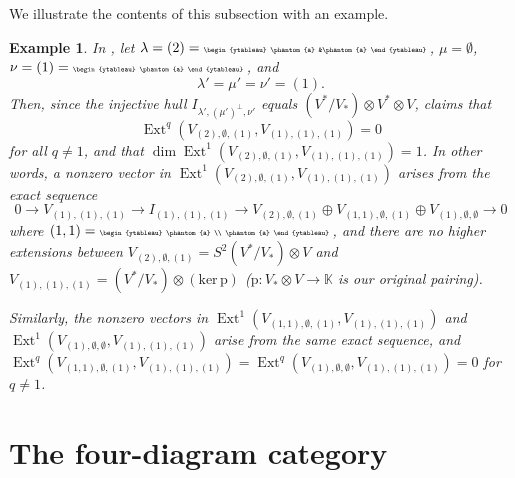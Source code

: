\documentclass[11pt]{article}
\theoremstyle{plain}
\theoremstyle{nonumberplain}
\theoremstyle{plain}
\newtheorem{example}[lemma]{Example}
\theoremstyle{nonumberplain}
\DeclareMathOperator{\Ext}{\mathrm{Ext}}
\begin{document}
We illustrate the contents of this subsection with an example. 


\begin{example}
  In , let $\lambda=(2)={\tiny\begin{ytableau}
 \phantom{a} &\phantom{a}
\end{ytableau}}\,$, $\mu=\emptyset$,  $\nu=(1)={\tiny\begin{ytableau}
 \phantom{a} 
\end{ytableau}}\,$, and 
  \begin{equation*}
    \lambda'=\mu'=\nu'=(1). 
  \end{equation*}
Then, since the injective hull $I_{\lambda',(\mu')^\perp,\nu'}$ equals $(V^*/V_*)\otimes V^*\otimes V$,  claims that $$\Ext^q\left(V_{(2),\emptyset,(1)},V_{(1),(1),(1)}\right)=0$$ for all $q\neq1$, and that $\dim\Ext^1\left(V_{(2),\emptyset,(1)},V_{(1),(1),(1)}\right)=1$. In other words, a nonzero vector in $\Ext^1\left(V_{(2),\emptyset,(1)},V_{(1),(1),(1)}\right)$ arises from the exact sequence
\begin{equation*}
  0\to V_{(1),(1),(1)}\to I_{(1),(1),(1)}\to V_{(2),\emptyset,(1)}\oplus V_{(1,1),\emptyset,(1)}\oplus V_{(1),\emptyset,\emptyset}\to 0
\end{equation*}
where $(1,1)={\tiny\begin{ytableau}
 \phantom{a} \\
 \phantom{a}
\end{ytableau}}\,$, 
and there are no higher extensions between $V_{(2),\emptyset,(1)} = S^2(V^*/V_*)\otimes V$ and $V_{(1),(1),(1)}=(V^*/V_*)\otimes(\mathrm{ker}\,\mathrm{p})$ ($\mathrm{p}:V_*\otimes V\to \mathbb{K}$ is our original pairing).  

Similarly, the nonzero vectors in $\Ext^1\left(V_{(1,1),\emptyset,(1)},V_{(1),(1),(1)}\right)$ and $\Ext^1\left(V_{(1),\emptyset,\emptyset},V_{(1),(1),(1)}\right)$ arise from the same exact sequence, and $\Ext^q\left(V_{(1,1),\emptyset,(1)},V_{(1),(1),(1)}\right)=\Ext^q\left(V_{(1),\emptyset,\emptyset},V_{(1),(1),(1)}\right)=0$ for $q\neq 1$.
\end{example}





\section{The four-diagram category}\label{sec.four}
\end{document}
